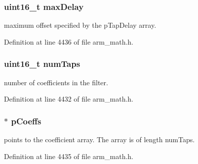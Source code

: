 \subsubsection[{\texorpdfstring{max\+Delay}{maxDelay}}]{\setlength{\rightskip}{0pt plus 5cm}uint16\+\_\+t max\+Delay}\hypertarget{structarm__fir__sparse__instance__f32_ab25f4ee7550e6d92acff77ada283733f}{}\label{structarm__fir__sparse__instance__f32_ab25f4ee7550e6d92acff77ada283733f}
maximum offset specified by the p\+Tap\+Delay array. 

Definition at line 4436 of file arm\+\_\+math.\+h.

\subsubsection[{\texorpdfstring{num\+Taps}{numTaps}}]{\setlength{\rightskip}{0pt plus 5cm}uint16\+\_\+t num\+Taps}\hypertarget{structarm__fir__sparse__instance__f32_a751941891e47f522a7f5375fe8990aac}{}\label{structarm__fir__sparse__instance__f32_a751941891e47f522a7f5375fe8990aac}
number of coefficients in the filter. 

Definition at line 4432 of file arm\+\_\+math.\+h.

\subsubsection[{\texorpdfstring{p\+Coeffs}{pCoeffs}}]{$\ast$ p\+Coeffs}\hypertarget{structarm__fir__sparse__instance__f32_aacbb8dd8eeba4b21fc2bb40076405ee3}{}\label{structarm__fir__sparse__instance__f32_aacbb8dd8eeba4b21fc2bb40076405ee3}
points to the coefficient array. The array is of length num\+Taps. 

Definition at line 4435 of file arm\+\_\+math.\+h.

